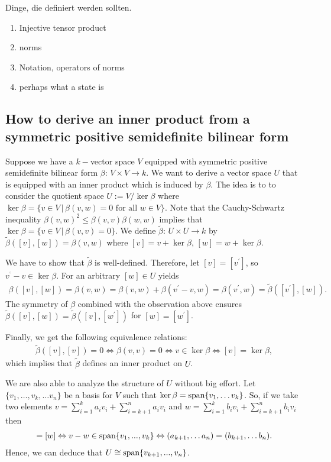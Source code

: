 Dinge, die definiert werden sollten. 
\begin{enumerate}
	\item Injective tensor product 
	\item norms
	\item Notation, operators of norms 
	\item  perhaps what a state is 
\end{enumerate}


\subsection{How to derive an inner product from a symmetric positive semidefinite bilinear form}
Suppose we have a $ k- $vector space $ V $ equipped with symmetric positive semidefinite bilinear form $ \beta: \, V \times V \to k $. We want to derive a vector space $ U $ that is equipped with an inner product which is induced by $ \beta $. The idea is to to consider the quotient space $ U:=V/\ker\beta $ where $ \ker \beta = \{ v \in V \, | \, \beta(v,w)= 0 \text{ for all } w \in V \} $. Note that the Cauchy-Schwartz inequality $ \beta(v,w)^2 \le \beta(v,v)\beta(w,w) $ implies that 
$ \ker \beta = \{ v \in V \, | \, \beta(v,v)= 0 \} $.
We define $ \tilde{\beta}:  \, U \times U \to k $ by $ \tilde{\beta}([v],[w]) = \beta(v,w) $ where $ [v] = v + \ker\beta, \,$$[w]=w+\ker\beta$.

We have to show that $ \tilde{\beta} $ is well-defined. Therefore, let $ [v]=[v^{'}] $, so $v^{‘}-v \in \ker \beta $. 
For an arbitrary $ [w] \in U $ yields 
\begin{align*}
	\beta([v],[w]) = \beta(v,w) = \beta(v,w)+\beta(v^{'}-v,w)= \beta(v^{'},w) = \tilde{\beta}([v^{'}],[w]).
\end{align*}
The symmetry of $ \beta $ combined with the observation above ensures $ \tilde{\beta}([v],[w]) = \tilde{\beta}([v],[w^{'}]) $ for $ [w]= [w^{'}] $.

Finally, we get the following equivalence relations: 
\begin{align*}
	\tilde{\beta}([v],[v]) = 0 \Leftrightarrow \beta(v,v) = 0 \Leftrightarrow v \in \ker \beta \Leftrightarrow [v]= \ker \beta,
\end{align*}
which implies that $ \tilde{\beta} $ defines an inner product on $ U $. 

We are also able to analyze the structure of $ U $ without big effort. Let $ \{ v_1,\hdots,v_k, \hdots v_n \} $ be a basis for $ V $ such that $ \ker \beta = \textup{span} \{ v_1,\hdots v_k \}$. So, if we take two elements 
$ v = \sum_{i=1}^{k}a_iv_i + \sum_{i=k+1}^{n}a_iv_i$ and $ w = \sum_{i=1}^{k}b_iv_i + \sum_{i=k+1}^{n}b_iv_i $ then 
\begin{align*}
	[v] = [w] \Leftrightarrow v-w \in \textup{span} \{  v_1,...,v_k \} \Leftrightarrow (a_{k+1},\hdots a_n) = (b_{k+1},\hdots b_n).
\end{align*} 
Hence, we can deduce that $ U \cong \textup{span} \{ v_{k+1},...,v_n \} $.